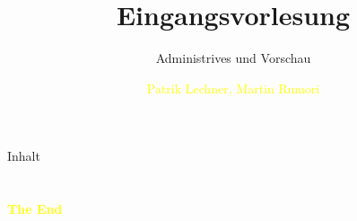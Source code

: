 \documentclass[aspectratio=43]{beamer}
\title{Eingangsvorlesung} %
\subtitle{Administrives und Vorschau}
\author[Lechner Rumori]{\textcolor{yellow}{Patrik Lechner, Martin Rumori}}
\institute[IC\textbackslash M/T]{
    \\%
    \textcolor{white}{FH St.Pölten}%
} %
\begin{document}
    
    \frame{\titlepage}
    
    \begin{frame}{Inhalt}
        \tableofcontents
    \end{frame}
        
    
    
    
    
    
    

    \section{}
    \begin{frame}{}
        \centering
            \Huge\bfseries
        \textcolor{yellow}{The End}
    \end{frame}
\end{document}

